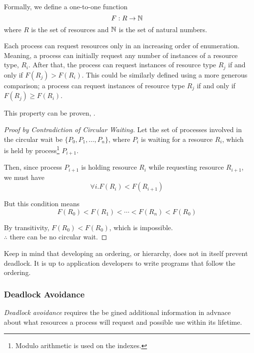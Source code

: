 Formally, we define a one-to-one function
\begin{equation*}
F: R \rightarrow \operatorname{\mathbb{N}}
\end{equation*}
where $R$ is the set of resources and  $\operatorname{\mathbb{N}}$ is the set of natural numbers.

Each process can request resources only in an increasing order of enumeration.
Meaning, a process can initially request any number of instances of a resource type, $R_{i}$.
After that, the process can request instances of resource type $R_{j}$ if and only if $F(R_{j}) > F(R_{i})$.
This could be similarly defined using a more generous comparison; a process can request instances of resource type $R_{j}$ if and only if $F(R_{j}) \geq F(R_{i})$.

This property can be proven, .

\begin{proof}[Proof by Contradiction of Circular Waiting]\label{proof:Circular_Wait}
  Let the set of processes involved in the circular wait be $\lbrace P_{0}, P_{1}, \ldots, P_{n} \rbrace$, where $P_{i}$ is waiting for a resource $R_{i}$, which is held by process\footnote{Modulo arithmetic is used on the indexes.} $P_{i+1}$.

  Then, since process $P_{i+1}$ is holding resource $R_{i}$ while requesting resource $R_{i+1}$, we must have
  \begin{equation*}
    \forall i. F(R_{i}) < F(R_{i+1})
  \end{equation*}

  But this condition means
  \begin{equation*}
    F(R_{0}) < F(R_{1}) < \cdots < F(R_{n}) < F (R_{0})
  \end{equation*}

  By transitivity, $F(R_{0}) < F(R_{0})$, which is impossible. \\
  $\therefore$ there can be no circular wait.
\end{proof}

\begin{blackbox}
  Keep in mind that developing an ordering, or hierarchy, does not in itself prevent deadlock.
  It is up to application developers to write programs that follow the ordering.
\end{blackbox}

\subsubsection{Deadlock Avoidance}\label{subsubsec:Deadlock_Avoidance}
\begin{definition}\label{def:Deadlock_Avoidance}
  \emph{Deadlock avoidance} requires the  be gined additional information in advnace about what resources a process will request and possible use within its lifetime.
\end{definition}

